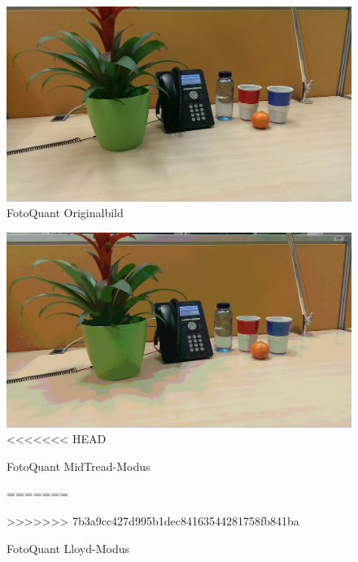\begin{landscape}

\begin{figure}[h]
	\centering
		\includegraphics[width=1.4\textwidth]{img/Fotos/FotoQuant_Original.jpg}
	\caption[FotoQuant Original]{FotoQuant Originalbild}
	\label{fig:quant_ori}
\end{figure}

\begin{figure}[h]
	\label{fig:quant_mid}
	\centering
		\includegraphics[width=1.4\textwidth]{img/Fotos/FotoQuant_Lloyd.jpg}
<<<<<<< HEAD
	\caption[FotoQuant MidTread]{FotoQuant MidTread-Modus}
	
=======
	\caption[FotoQuant Lloyd]{FotoQuant Lloyd-Modus}
	\label{fig:quant_lloyd}
>>>>>>> 7b3a9cc427d995b1dec84163544281758fb841ba
\end{figure}


\end{landscape}
